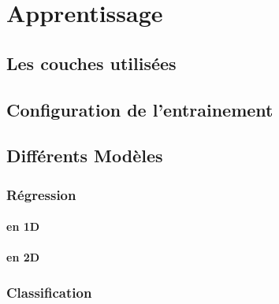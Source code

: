 
\chapter{Apprentissage} %

\label{Chapter5} %


\section{Les couches utilisées}


\section{Configuration de l'entrainement}


\section{Différents Modèles}

\subsection{Régression}
% 
    \subsubsection{en 1D}

    \subsubsection{en 2D}

\subsection{Classification}

